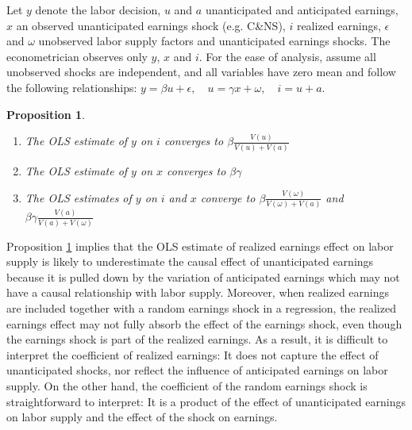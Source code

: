 \documentclass[reviewmode]{restat}
\newtheorem{proposition}{Proposition}
\begin{document}
Let $y$ denote the labor decision, $u$ and $a$ unanticipated and anticipated earnings, $x$ an observed
unanticipated earnings shock (e.g. C\&NS), $i$ realized earnings, $\epsilon$ and $\omega$ unobserved labor
supply factors and unanticipated earnings shocks. The econometrician observes only $y$, $x$ and $i$.
For the ease of analysis, assume all unobserved shocks are independent, and all variables have zero mean 
and follow the following relationships: \(y = \beta u + \epsilon, \quad u = \gamma x + \omega, \quad i = u + a \).
\begin{proposition}
\label{prop:ols1}
\begin{enumerate}
\item[(a)] The OLS estimate of $y$ on $i$ converges to $\beta\frac{V(u)}{V(u) + V(a)}$
\item[(b)] The OLS estimate of $y$ on $x$ converges to $\beta\gamma$
\item[(c)] The OLS estimates of $y$ on $i$ and $x$ converge to $\beta\frac{V(\omega)}{V(\omega) + V(a)}$ and $\beta\gamma\frac{V(a)}{V(a)+V(\omega)}$
\end{enumerate}
\end{proposition}


Proposition \ref{prop:ols1} implies that the OLS estimate of realized earnings effect on labor supply is
likely to underestimate the causal effect of unanticipated earnings because it is pulled down by the variation 
of anticipated earnings which may not have a causal relationship with labor supply. Moreover, when realized
earnings are included together with a random earnings shock in a regression, the realized earnings effect may
not fully absorb the effect of the earnings shock, even though the earnings shock is part of the realized 
earnings. As a result, it is difficult to interpret the coefficient of realized earnings: It does not 
capture the effect of unanticipated shocks, nor reflect the influence of anticipated earnings on labor supply.
On the other hand, the coefficient of the random earnings shock is straightforward to interpret: It is a
product of the effect of unanticipated earnings on labor supply and the effect of the shock on earnings.
\end{document}
